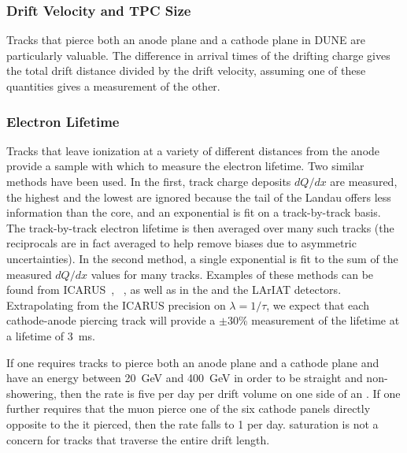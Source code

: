 \subsubsection{Drift Velocity and TPC Size}

Tracks that pierce both an anode plane and a cathode plane in DUNE are particularly valuable. %
The difference in arrival times of the drifting charge gives the total drift distance divided by the
drift velocity, assuming one of these quantities gives a measurement of the other.

\subsubsection{Electron Lifetime}

Tracks that leave ionization at a variety of different distances from the anode provide a sample
with which to measure the electron lifetime.  Two similar methods have been used.  In the
first, track charge deposits $dQ/dx$ are measured, the highest and the lowest are ignored because
the tail of the Landau offers less information than the core, and an exponential is fit on a 
track-by-track basis.  The track-by-track electron lifetime is then averaged over many such tracks
(the reciprocals are in fact averaged to help remove biases due to asymmetric uncertainties).  In
the second method, a single exponential is fit to the sum of the measured $dQ/dx$ values for many tracks.
Examples of these methods can be found from ICARUS~\cite{Antonello:2014eha}, 
\microboone~\cite{MICROBOONE-NOTE-1026-PUB}, as well as in the  and
the LArIAT detectors.  Extrapolating from the ICARUS precision on $\lambda = 1/\tau$, we expect
that each cathode-anode piercing track will provide a $\pm 30$\% measurement of the lifetime
at a lifetime of \SI{3}{\milli\s}.

If one requires tracks to pierce both an anode plane and a cathode plane and have an energy between \SI{20}{\GeV}
and \SI{400}{\GeV} in order to be straight and non-showering, then the rate is five per day per drift volume
on one side of an .  If one further requires that the muon pierce one of the six cathode panels
directly opposite to the  it pierced, then the rate falls to \num{1} per day.   saturation is not
a concern for tracks that traverse the entire drift length.

